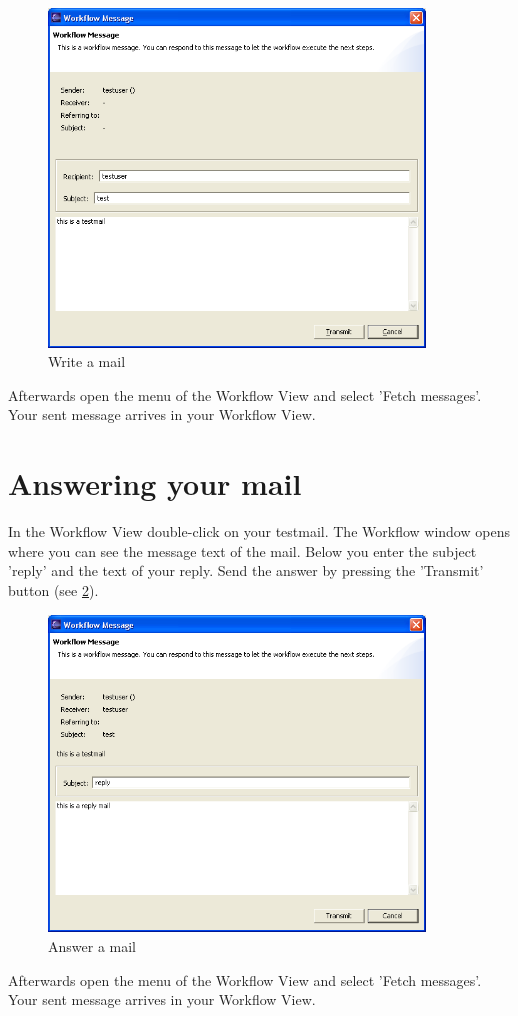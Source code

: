 \begin{figure}[h!]
\begin{center}
\includegraphics[width=10cm]{tutorial16.png}
   \caption{Write a mail}
   \label{mail1}
\end{center}
\end{figure}\par

Afterwards open the menu of the Workflow View and select 'Fetch messages'. Your sent
message arrives in your Workflow View.

\section{Answering your mail}

In the Workflow View double-click on your testmail. The Workflow
window opens where you can see the message text of the mail. Below you enter
the subject 'reply' and the text of your reply. Send the answer by pressing the 'Transmit' 
button (see \ref{mail2}). 

\begin{figure}[h!]
\begin{center}
\includegraphics[width=10cm]{tutorial17.png}
   \caption{Answer a mail}
   \label{mail2}
\end{center}
\end{figure}\par

Afterwards open the menu of the Workflow View and select 'Fetch messages'. Your sent
message arrives in your Workflow View.





